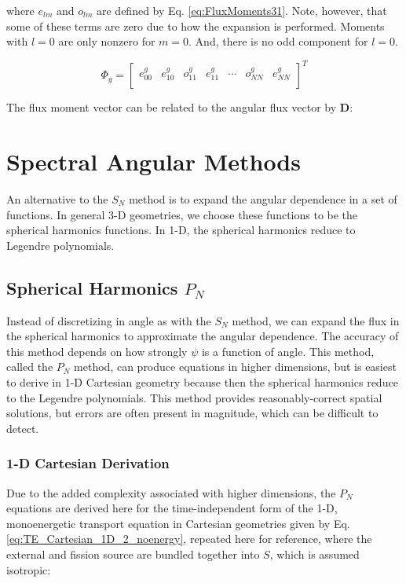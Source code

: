 \documentclass[10pt]{article}
\begin{document}
\begin{flushleft}
where \(e_{lm}\) and \(o_{lm}\) are defined by Eq. \eqref{eq:FluxMoments31}. Note, however, that some of these terms are zero due to how the expansion is performed. Moments with \(l=0\) are only nonzero for \(m=0\). And, there is no odd component for \(l=0\). 

\begin{equation}
\Phi_g=\begin{bmatrix}
e_{00}^g & e_{10}^g & o_{11}^g & e_{11}^g & \cdots & o_{NN}^g & e_{NN}^g\\
\end{bmatrix}^T
\end{equation}

The flux moment vector can be related to the angular flux vector by \(\textbf{D}\):



\section{Spectral Angular Methods}
An alternative to the \(S_N\) method is to expand the angular dependence in a set of functions. In general 3-D geometries, we choose these functions to be the spherical harmonics functions. In 1-D, the spherical harmonics reduce to Legendre polynomials. 


\subsection{Spherical Harmonics \(P_N\)}

Instead of discretizing in angle as with the \(S_N\) method, we can expand the flux in the spherical harmonics to approximate the angular dependence. The accuracy of this method depends on how strongly \(\psi\) is a function of angle. This method, called the \(P_N\) method, can produce equations in higher dimensions, but is easiest to derive in 1-D Cartesian geometry because then the spherical harmonics reduce to the Legendre polynomials. This method provides reasonably-correct spatial solutions, but errors are often present in magnitude, which can be difficult to detect.

\subsubsection{1-D Cartesian Derivation}

Due to the added complexity associated with higher dimensions, the \(P_N\) equations are derived here for the time-independent form of the 1-D, monoenergetic transport equation in Cartesian geometries given by Eq. \eqref{eq:TE_Cartesian_1D_2_noenergy}, repeated here for reference, where the external and fission source are bundled together into \(S\), which is assumed isotropic:


\end{flushleft}
\end{document}
